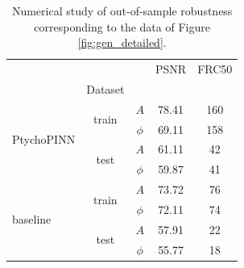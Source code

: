 \documentclass[sn-mathphys]{sn-jnl}%
\theoremstyle{thmstyleone}%
\theoremstyle{thmstyletwo}%
\theoremstyle{thmstylethree}%
\begin{document}
\begin{table}[h]
\begin{center}
\caption{Numerical study of out-of-sample robustness corresponding to the data of Figure \ref{fig:gen_detailed}.}\label{tab2}%
\begin{tabular}{lcccc}
\toprule
           &      &      &  PSNR &  FRC50 \\
& Dataset & &       &        \\
\midrule
\multirow{4}{*}{PtychoPINN} & \multirow{2}{*}{train} & $A$ & 78.41 & 160 \\
           &      & $\phi$ & 69.11 & 158 \\
\cline{2-5}
           & \multirow{2}{*}{test} & $A$ & 61.11 &  42 \\
           &      & $\phi$ & 59.87 &  41 \\
\cline{1-5}
\cline{2-5}
\multirow{4}{*}{baseline} & \multirow{2}{*}{train} & $A$ & 73.72 &  76 \\
           &      & $\phi$ & 72.11 &  74 \\
\cline{2-5}
           & \multirow{2}{*}{test} & $A$ & 57.91 &  22 \\
           &      & $\phi$ & 55.77 &  18 \\
\bottomrule
\end{tabular}
\end{center}
\end{table}

\end{document}
